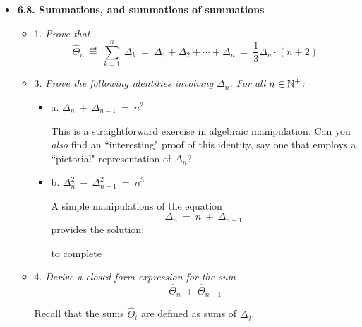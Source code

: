 \begin{itemize}
\item
{\bf 6.8. Summations, and summations of summations}
\smallskip

  \begin{itemize}
  \item 1.
{\em Prove that}
\[ \widehat{\Theta}_n \ \eqdef \  \sum_{k=1}^n \ \Delta_k \ = \   
\Delta_1 + \Delta_2 + \cdots + \Delta_n \ = \ \frac{1}{3} \Delta_n \cdot (n+2) \]


  \item 3.
{\em Prove the following identities involving $\Delta_n$.  For all $n \in \mathbb{N}^+$:}
    \begin{itemize}
    \item a.
$\Delta_n \ + \ \Delta_{n-1} \ = \ n^2$

\smallskip

This is a straightforward exercise in algebraic manipulation.  Can you {\em also} find an ``interesting" proof of this identity, say one that employs a ``pictorial" representation of $\Delta_n$?

 \item b.
$\Delta_n^2 \ - \ \Delta_{n-1}^2 \ = \ n^3$

\smallskip

A simple manipulations of the equation 
\[ \Delta_n \ = \ n \ + \ \Delta_{n-1} \]
provides the solution:

to complete
   \end{itemize}

  \item 4.
{\em Derive a closed-form expression for the sum}
\[ \widehat{\Theta}_n \ + \ \widehat{\Theta} _{n-1} \]

\smallskip

Recall that the sums $\widehat{\Theta}_i$ are defined as sums of $\Delta_j$.  
\end{itemize}
\end{itemize} 


